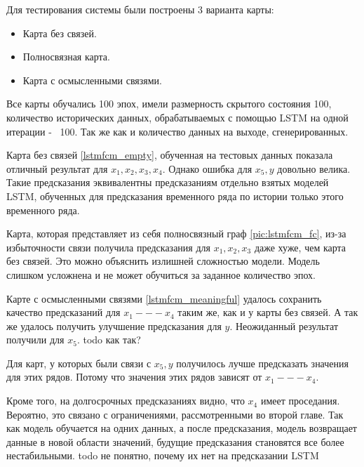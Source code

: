 Для тестирования системы были построены 3 варианта карты:
\begin{itemize}
	\item Карта без связей.
	\item Полносвязная карта.
	\item Карта с осмысленными связями.
\end{itemize}

Все карты обучались 100 эпох, имели размерность скрытого состояния 100,
количество исторических данных, обрабатываемых с помощью LSTM на одной итерации -~ 100.
Так же как и количество данных на выходе, сгенерированных.


Карта без связей \ref{lstmfcm_empty}, обученная на тестовых данных
показала отличный результат для $ x_1, x_2, x_3, x_4  $. Однако ошибка
для $ x_5, y $ довольно велика. Такие предсказания эквивалентны предсказаниям
отдельно взятых моделей LSTM, обученных для предсказания временного ряда
по истории только этого временного ряда.

Карта, которая представляет из себя полносвязный граф \ref{pic:lstmfcm_fc},
из-за избыточности связи получила предсказания для $ x_1, x_2, x_3 $ даже
хуже, чем карта без связей. Это можно объяснить излишней сложностью модели.
Модель слишком усложнена и не может обучиться за заданное количество эпох.

Карте с осмысленными связями \ref{lstmfcm_meaningful} удалось сохранить качество
предсказаний для $ x_1 --- x_4 $ таким же, как и у карты без связей.
А так же удалось получить улучшение предсказания для $ y $.
Неожиданный результат получили для $ x_5 $. todo как так?

Для карт, у которых были связи с $ x_5, y $ получилось лучше предсказать значения
для этих рядов. Потому что значения этих рядов зависят от $ x_1 --- x_4 $.

Кроме того, на долгосрочных предсказаниях видно, что $ x_4 $ имеет проседания.
Вероятно, это связано с ограничениями, рассмотренными во второй главе.
Так как модель обучается на одних данных, а после предсказания, модель возвращает
данные в новой области значений, будущие предсказания становятся все более нестабильными.
todo не понятно, почему их нет на предсказании LSTM

